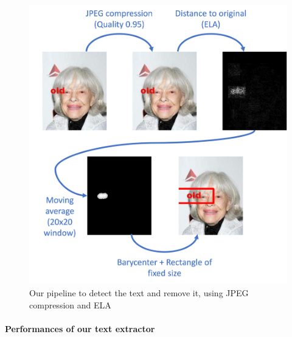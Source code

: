\documentclass[sigconf, nonacm]{acmart}
\begin{document}
\begin{figure}[!h]
    \centering
    \includegraphics[width=\columnwidth]{figures/text-detection.png}
    \caption{Our pipeline to detect the text and remove it, using JPEG compression and ELA}
    \label{fig:text_detection}
\end{figure}

\paragraph{Performances of our text extractor} 
\end{document}
